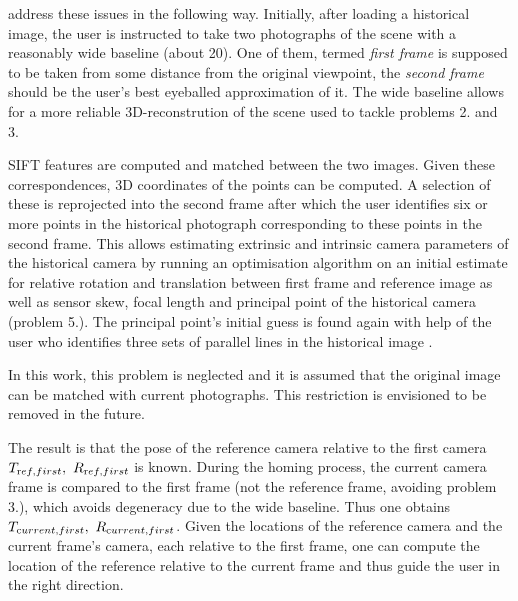 \citet{bae2010} address these issues in the following way.
Initially, after loading a historical image, the user is instructed to
take two photographs of the scene with a reasonably wide baseline (about
20\textdegree). One of them, termed \emph{first frame} is supposed to be
taken from some distance from the original viewpoint, the \emph{second
frame} should be the user's best eyeballed approximation of it. The wide
baseline allows for a more reliable 3D-reconstrution of the scene used to
tackle problems 2. and 3. 

SIFT features are computed and matched between the two images.  Given these
correspondences, 3D coordinates of the points can be computed. A selection of
these is reprojected into the second frame after which the user identifies six
or more points in the historical photograph corresponding to these points in the
second frame. This allows estimating extrinsic and intrinsic camera parameters
of the historical camera by running an optimisation algorithm on an initial
estimate for relative rotation and translation between first frame and reference
image as well as sensor skew, focal length and principal point of the historical
camera (problem 5.).  The principal point's initial guess is found again with
help of the user who identifies three sets of parallel lines in the historical
image \citep[see][chapter 8.8]{h&z2004}.

In this work, this problem is neglected and it is assumed that the original
image can be matched with current photographs. This restriction is envisioned to
be removed in the future.

The result is that the pose of the reference camera relative to the first
camera $T_{\text ref,first},~R_{\text ref,first}$ is known. During the homing
process, the current camera frame is compared to the first frame (not the
reference frame, avoiding problem 3.), which avoids degeneracy due to the wide
baseline. Thus one obtains $T_{\text current,first},~R_{\text current,first}$.
Given the locations of the reference camera and the current frame's camera, each
relative to the first frame, one can compute the location of the reference
relative to the current frame and thus guide the user in the right direction.

